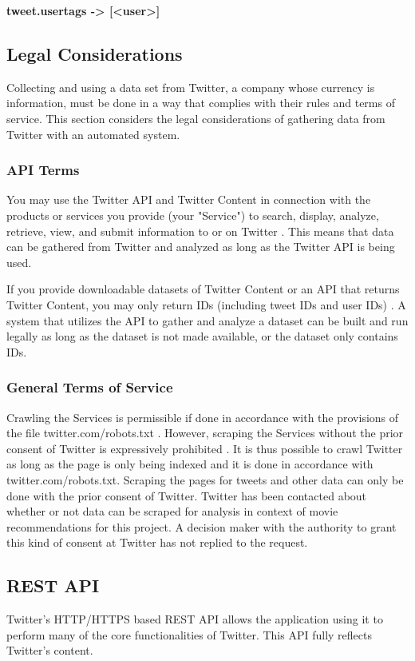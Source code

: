 \textbf{tweet.usertags -> [<user>]}

\subsection{Legal Considerations}\label{sec:pre-twitter-legal}
Collecting and using a data set from Twitter, a company whose currency is information, must be done in a way that complies with their rules and terms of service. This section considers the legal considerations of gathering data from Twitter with an automated system.

\subsubsection{API Terms}
You may use the Twitter API and Twitter Content in connection with the products or services you provide (your "Service") to search, display, analyze, retrieve, view, and submit information to or on Twitter \cite{twitter-api-terms}. This means that data can be gathered from Twitter and analyzed as long as the Twitter API is being used.

If you provide downloadable datasets of Twitter Content or an API that returns Twitter Content, you may only return IDs (including tweet IDs and user IDs) \cite{twitter-api-terms}. A system that utilizes the API to gather and analyze a dataset can be built and run legally as long as the dataset is not made available, or the dataset only contains IDs.

\subsubsection{General Terms of Service}
Crawling the Services is permissible if done in accordance with the provisions of the file twitter.com/robots.txt \cite{twitter-robots-txt}. However, scraping the Services without the prior consent of Twitter is expressively prohibited \cite{twitter-tos}. It is thus possible to crawl Twitter as long as the page is only being indexed and it is done in accordance with twitter.com/robots.txt. Scraping the pages for tweets and other data can only be done with the prior consent of Twitter. Twitter has been contacted about whether or not data can be scraped for analysis in context of movie recommendations for this project. A decision maker with the authority to grant this kind of consent at Twitter has not replied to the request.


\subsection{REST API}\label{sec:pre-twitter-rest}
Twitter's HTTP/HTTPS based REST API allows the application using it to perform many of the core functionalities of Twitter. This API fully reflects Twitter's content.

